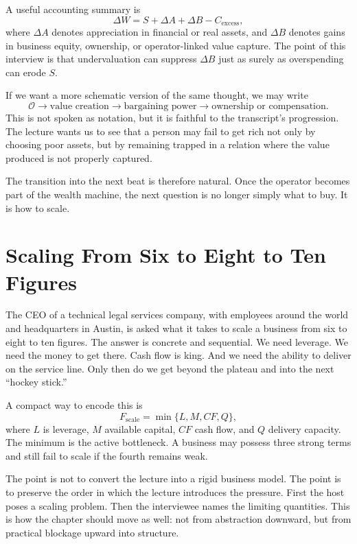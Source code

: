 A useful accounting summary is
\begin{equation}
\Delta W = S + \Delta A + \Delta B - C_{\text{excess}},
\end{equation}
where $\Delta A$ denotes appreciation in financial or real assets, and $\Delta B$ denotes gains in business equity, ownership, or operator-linked value capture. The point of this interview is that undervaluation can suppress $\Delta B$ just as surely as overspending can erode $S$.

If we want a more schematic version of the same thought, we may write
\begin{equation}
\mathcal{O} \longrightarrow \text{value creation} \longrightarrow \text{bargaining power} \longrightarrow \text{ownership or compensation}.
\end{equation}
This is not spoken as notation, but it is faithful to the transcript's progression. The lecture wants us to see that a person may fail to get rich not only by choosing poor assets, but by remaining trapped in a relation where the value produced is not properly captured.

The transition into the next beat is therefore natural. Once the operator becomes part of the wealth machine, the next question is no longer simply what to buy. It is how to scale.

\section{Scaling From Six to Eight to Ten Figures}

The CEO of a technical legal services company, with employees around the world and headquarters in Austin, is asked what it takes to scale a business from six to eight to ten figures. The answer is concrete and sequential. We need leverage. We need the money to get there. Cash flow is king. And we need the ability to deliver on the service line. Only then do we get beyond the plateau and into the next ``hockey stick.''

A compact way to encode this is
\begin{equation}
F_{\text{scale}}=\min\{L,M,CF,Q\},
\end{equation}
where $L$ is leverage, $M$ available capital, $CF$ cash flow, and $Q$ delivery capacity. The minimum is the active bottleneck. A business may possess three strong terms and still fail to scale if the fourth remains weak.

The point is not to convert the lecture into a rigid business model. The point is to preserve the order in which the lecture introduces the pressure. First the host poses a scaling problem. Then the interviewee names the limiting quantities. This is how the chapter should move as well: not from abstraction downward, but from practical blockage upward into structure.

